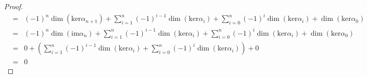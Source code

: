 \documentclass[letterpaper]{article}
\begin{document}
\begin{enumerate}
\begin{proof}
\[\begin{array}{rcl}
&=&(-1)^{n}\dim (\text{ker}\alpha_{n+1}) + \sum\limits_{i=1}^{n}(-1)^{i-1}\dim (\text{ker}\alpha_{i})+ \sum\limits_{i=0}^n(-1)^i\dim (\text{ker}\alpha_i) + \dim (\text{ker}\alpha_{0})\\ 

&=&(-1)^{n}\dim (\text{im}\alpha_{n}) + \sum\limits_{i=1}^{n}(-1)^{i-1}\dim (\text{ker}\alpha_{i})+ \sum\limits_{i=0}^n(-1)^i\dim (\text{ker}\alpha_i) + \dim (\text{ker}\alpha_{0})\\

&=&0 + \left(\sum\limits_{i=1}^{n}(-1)^{i-1}\dim (\text{ker}\alpha_{i})+ \sum\limits_{i=0}^n(-1)^i\dim (\text{ker}\alpha_i)\right) + 0\\

&=&0
\end{array}
\]
\end{proof}

\end{enumerate}
\end{document}
